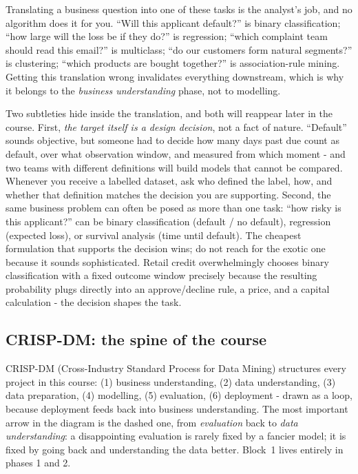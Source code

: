 \documentclass[11pt,a4paper]{article}
\begin{document}
Translating a business question into one of these tasks is the analyst's
job, and no algorithm does it for you. ``Will this applicant default?'' is
binary classification; ``how large will the loss be if they do?'' is
regression; ``which complaint team should read this email?'' is multiclass;
``do our customers form natural segments?'' is clustering; ``which products
are bought together?'' is association-rule mining. Getting this translation
wrong invalidates everything downstream, which is why it belongs to the
\emph{business understanding} phase, not to modelling.

Two subtleties hide inside the translation, and both will reappear later in
the course. First, \emph{the target itself is a design decision}, not a fact
of nature. ``Default'' sounds objective, but someone had to decide how many
days past due count as default, over what observation window, and measured
from which moment - and two teams with different definitions will build
models that cannot be compared. Whenever you receive a labelled dataset,
ask who defined the label, how, and whether that definition matches the
decision you are supporting. Second, the same business problem can often be
posed as more than one task: ``how risky is this applicant?'' can be binary
classification (default / no default), regression (expected loss), or
survival analysis (time until default). The cheapest formulation that
supports the decision wins; do not reach for the exotic one because it
sounds sophisticated. Retail credit overwhelmingly chooses binary
classification with a fixed outcome window precisely because the resulting
probability plugs directly into an approve/decline rule, a price, and a
capital calculation - the decision shapes the task.

\subsection{CRISP-DM: the spine of the course}
CRISP-DM (Cross-Industry Standard Process for Data Mining) structures every
project in this course: (1) business understanding, (2) data understanding,
(3) data preparation, (4) modelling, (5) evaluation, (6) deployment - drawn
as a loop, because deployment feeds back into business understanding. The
most important arrow in the diagram is the dashed one, from \emph{evaluation}
back to \emph{data understanding}: a disappointing evaluation is rarely fixed
by a fancier model; it is fixed by going back and understanding the data
better. Block~1 lives entirely in phases 1 and 2.
\end{document}
